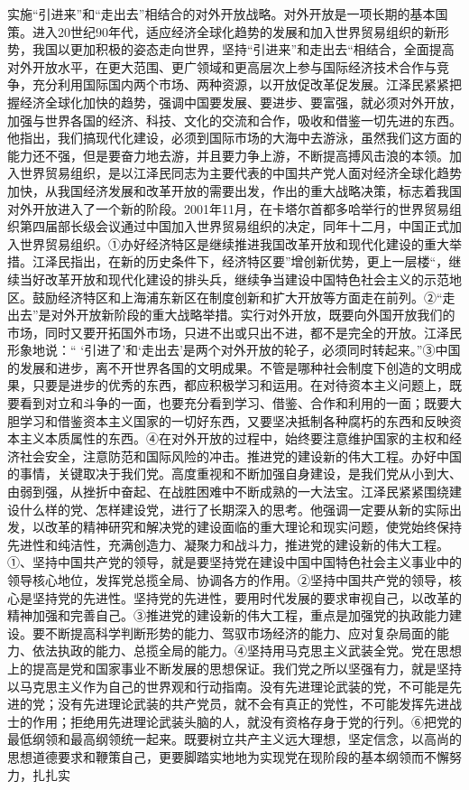 \documentclass[12pt,UTF8]{ctexart}
\begin{document}
实施“引进来”和“走出去”相结合的对外开放战略。对外开放是一项长期的基本国策。进入20世纪90年代，适应经济全球化趋势的发展和加入世界贸易组织的新形势，我国以更加积极的姿态走向世界，坚持“引进来”和走出去“相结合，全面提高对外开放水平，在更大范围、更广领域和更高层次上参与国际经济技术合作与竞争，充分利用国际国内两个市场、两种资源，以开放促改革促发展。江泽民紧紧把握经济全球化加快的趋势，强调中国要发展、要进步、要富强，就必须对外开放，加强与世界各国的经济、科技、文化的交流和合作，吸收和借鉴一切先进的东西。他指出，我们搞现代化建设，必须到国际市场的大海中去游泳，虽然我们这方面的能力还不强，但是要奋力地去游，并且要力争上游，不断提高搏风击浪的本领。加入世界贸易组织，是以江泽民同志为主要代表的中国共产党人面对经济全球化趋势加快，从我国经济发展和改革开放的需要出发，作出的重大战略决策，标志着我国对外开放进入了一个新的阶段。2001年11月，在卡塔尔首都多哈举行的世界贸易组织第四届部长级会议通过中国加入世界贸易组织的决定，同年十二月，中国正式加入世界贸易组织。①办好经济特区是继续推进我国改革开放和现代化建设的重大举措。江泽民指出，在新的历史条件下，经济特区要”增创新优势，更上一层楼“，继续当好改革开放和现代化建设的排头兵，继续争当建设中国特色社会主义的示范地区。鼓励经济特区和上海浦东新区在制度创新和扩大开放等方面走在前列。②“走出去”是对外开放新阶段的重大战略举措。实行对外开放，既要向外国开放我们的市场，同时又要开拓国外市场，只进不出或只出不进，都不是完全的开放。江泽民形象地说：“ ‘引进了’和‘走出去’是两个对外开放的轮子，必须同时转起来。”③中国的发展和进步，离不开世界各国的文明成果。不管是哪种社会制度下创造的文明成果，只要是进步的优秀的东西，都应积极学习和运用。在对待资本主义问题上，既要看到对立和斗争的一面，也要充分看到学习、借鉴、合作和利用的一面；既要大胆学习和借鉴资本主义国家的一切好东西，又要坚决抵制各种腐朽的东西和反映资本主义本质属性的东西。④在对外开放的过程中，始终要注意维护国家的主权和经济社会安全，注意防范和国际风险的冲击。推进党的建设新的伟大工程。办好中国的事情，关键取决于我们党。高度重视和不断加强自身建设，是我们党从小到大、由弱到强，从挫折中奋起、在战胜困难中不断成熟的一大法宝。江泽民紧紧围绕建设什么样的党、怎样建设党，进行了长期深入的思考。他强调一定要从新的实际出发，以改革的精神研究和解决党的建设面临的重大理论和现实问题，使党始终保持先进性和纯洁性，充满创造力、凝聚力和战斗力，推进党的建设新的伟大工程。①、坚持中国共产党的领导，就是要坚持党在建设中国中国特色社会主义事业中的领导核心地位，发挥党总揽全局、协调各方的作用。②坚持中国共产党的领导，核心是坚持党的先进性。坚持党的先进性，要用时代发展的要求审视自己，以改革的精神加强和完善自己。③推进党的建设新的伟大工程，重点是加强党的执政能力建设。要不断提高科学判断形势的能力、驾驭市场经济的能力、应对复杂局面的能力、依法执政的能力、总揽全局的能力。④坚持用马克思主义武装全党。党在思想上的提高是党和国家事业不断发展的思想保证。我们党之所以坚强有力，就是坚持以马克思主义作为自己的世界观和行动指南。没有先进理论武装的党，不可能是先进的党；没有先进理论武装的共产党员，就不会有真正的党性，不可能发挥先进战士的作用；拒绝用先进理论武装头脑的人，就没有资格存身于党的行列。⑥把党的最低纲领和最高纲领统一起来。既要树立共产主义远大理想，坚定信念，以高尚的思想道德要求和鞭策自己，更要脚踏实地地为实现党在现阶段的基本纲领而不懈努力，扎扎实
\end{document}
